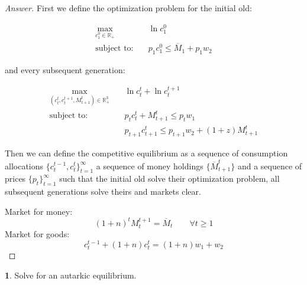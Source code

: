 \documentclass{article}
\theoremstyle{definition}
\newtheorem{subproblem}{}[problem]
\begin{document}
\begin{proof}[Answer]

First we define the optimization problem for the initial old:

\begin{align}\label{initoldprob}
    \max_{c_1^0\in\mathbb{R}_+}&\quad \ln{c^0_1} \\
    \text{subject to:}&\quad p_1c^0_1 \leq \overline{M}_1 + p_1w_2
\end{align}

and every subsequent generation:

\begin{align}\label{subseqgen}
    \max_{(c_t^t,c_t^{t+1}, M^{t}_{t+1})\in\mathbb{R}_+^3}&\quad \ln{c_t^t} + \ln{c_t^{t+1}}\\
    \text{subject to:}&\quad p_tc^t_t + M^{t}_{t+1} \leq p_t w_1\\
    &\quad p_{t+1}c^t_{t+1} \leq p_{t+1} w_2 +  (1+z)M^{t}_{t+1}
\end{align}

Then we can define the competitive equilibrium as a sequence of consumption allocations $\{c^{t-1}_t, c_t^t\}_{t=1}^\infty$ a sequence of money holdings $\{\overline{M}_{t+1}^t\}$ and a sequence of prices $\{p_t\}_{t=1}^\infty$ such that the initial old solve their optimization problem, all subsequent generations solve theirs and markets clear.

Market for money:
$$(1+n)^tM_t^{t+1} = \overline{M}_t \qquad \forall t\geq 1$$ 
Market for goods:
$$c_t^{t-1}+(1+n)c_{t}^t = (1+n)w_1 + w_2$$
\end{proof}

\begin{subproblem}
Solve for an autarkic equilibrium.
\end{subproblem}
\end{document}

